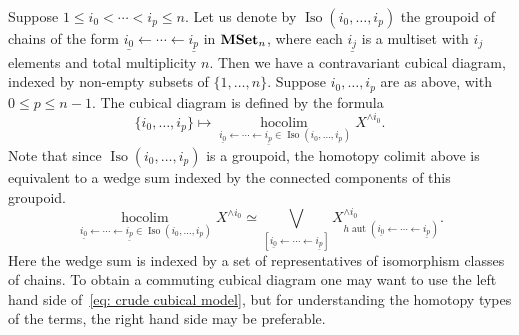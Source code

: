 \documentclass[psamsfonts]{amsart}
\theoremstyle{plain}
\theoremstyle{definition}
\theoremstyle{remark}
\newcommand{\catname}[1]{{\normalfont\textbf{#1}}}
\newcommand{\mset}{\catname{MSet}}
\newcommand{\aut}{\operatorname{aut}}
\DeclareMathOperator{\hocolim}{hocolim \,}
\begin{document}
Suppose $1\le i_0< \cdots < i_p \le n$. Let us denote by $\operatorname{Iso}(i_0, \ldots, i_p)$ the groupoid of chains of the form $\underline{i_0}\leftarrow \cdots \leftarrow \underline{i_p}$ in $\mset_n$, where each $\underline{i_j}$ is a multiset with $i_j$ elements and total multiplicity $n$. Then we have a contravariant cubical diagram, indexed by non-empty subsets of $\{1, \ldots, n\}$. Suppose $i_0, \ldots, i_p$ are as above, with $0\le p\le n-1$. The cubical diagram is defined by the formula
\begin{equation}\label{eq:cubical model}
\{i_0, \ldots, i_p\}\mapsto \underset{\underline{i_0}\leftarrow \cdots \leftarrow \underline{i_p}\in \operatorname{Iso}(i_0, \ldots, i_p)}{\hocolim} X^{\wedge i_0}.
\end{equation}
Note that since $\operatorname{Iso}(i_0, \ldots, i_p)$ is a groupoid, the homotopy colimit above is equivalent to a wedge sum indexed by the connected components of this groupoid. 
\begin{equation}\label{eq: crude cubical model}
\underset{\underline{i_0}\leftarrow \cdots \leftarrow \underline{i_p}\in\operatorname{Iso}(i_0, \ldots, i_p)}{\hocolim} X^{\wedge i_0}\simeq \bigvee_{[\underline{i_0}\leftarrow \cdots \leftarrow \underline{i_p}]} X^{\wedge i_0}_{h\aut(\underline{i_0}\leftarrow \cdots \leftarrow \underline{i_p})}.
\end{equation}
Here the wedge sum is indexed by a set of representatives of isomorphism classes of chains. 
To obtain a commuting cubical diagram one may want to use the left hand side of~\eqref{eq: crude cubical model}, but for understanding the homotopy types of the terms, the right hand side may be preferable.
\end{document}
